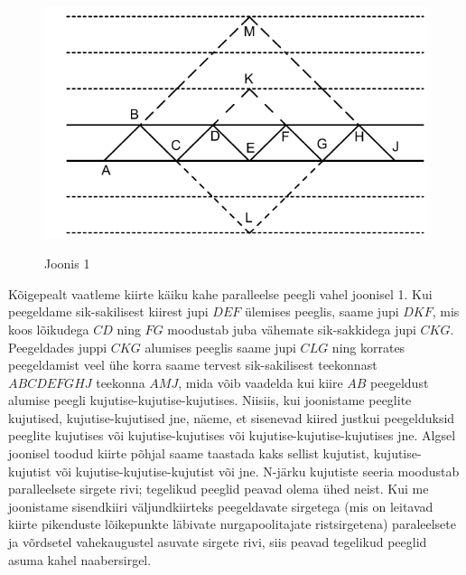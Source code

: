 \documentclass[10pt]{article}
\begin{document}
\vspace{10pt}
\probend
\bigskip

\setAuthor{}

\solu
\begin{figure}[h]
\centering
\includegraphics[width=0.5\linewidth]{2020-v3g-08-yl1.pdf}\par
Joonis 1
\end{figure}
Kõigepealt vaatleme kiirte käiku kahe paralleelse peegli vahel joonisel 1. Kui peegeldame sik-sakilisest kiirest jupi $DEF$ ülemises peeglis, saame jupi $DKF$, mis koos lõikudega $CD$ ning $FG$ moodustab juba vähemate sik-sakkidega jupi $CKG$. Peegeldades juppi $CKG$  alumises peeglis saame jupi $CLG$ ning korrates peegeldamist veel ühe korra saame tervest sik-sakilisest teekonnast $ABCDEFGHJ$ teekonna $AMJ$, mida võib vaadelda kui kiire $AB$ peegeldust alumise peegli kujutise-kujutise-kujutises. Niisiis, kui joonistame peeglite kujutised, kujutise-kujutised jne, näeme, et sisenevad kiired justkui peegelduksid peeglite kujutises või kujutise-kujutises või kujutise-kujutise-kujutises jne. Algsel joonisel toodud kiirte põhjal saame taastada kaks sellist kujutist, kujutise-kujutist või kujutise-kujutise-kujutist  või jne. N-järku kujutiste seeria moodustab paralleelsete sirgete rivi; tegelikud peeglid peavad olema ühed neist. Kui me joonistame sisendkiiri väljundkiirteks peegeldavate  sirgetega (mis on leitavad kiirte pikenduste lõikepunkte läbivate nurgapoolitajate ristsirgetena) paraleelsete ja võrdsetel vahekaugustel asuvate sirgete rivi, siis peavad tegelikud peeglid asuma kahel naabersirgel.
\end{document}
